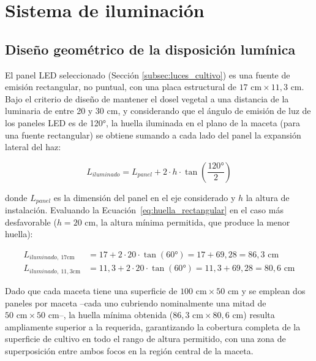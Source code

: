 \section{Sistema de iluminación}

\subsection{Diseño geométrico de la disposición lumínica}
\label{subsec:diseno_geometrico_luz}

El panel LED seleccionado (Sección \ref{subsec:luces_cultivo}) es una fuente de emisión rectangular, no puntual, con una placa estructural de $17\text{ cm} \times 11{,}3\text{ cm}$. Bajo el criterio de diseño de mantener el dosel vegetal a una distancia de la luminaria de entre 20 y 30 cm, y considerando que el ángulo de emisión de luz de los paneles LED es de 120°, la huella iluminada en el plano de la maceta (para una fuente rectangular) se obtiene sumando a cada lado del panel la expansión lateral del haz:

\begin{equation}
    L_{iluminado} = L_{panel} + 2 \cdot h \cdot \tan\left(\frac{120°}{2}\right)
    \label{eq:huella_rectangular}
\end{equation}

\noindent donde $L_{panel}$ es la dimensión del panel en el eje considerado y $h$ la altura de instalación. Evaluando la Ecuación~\ref{eq:huella_rectangular} en el caso más desfavorable ($h = 20\text{ cm}$, la altura mínima permitida, que produce la menor huella):

\begin{align*}
    L_{iluminado,\ 17\text{cm}} &= 17 + 2 \cdot 20 \cdot \tan(60°) = 17 + 69{,}28 = 86{,}3\text{ cm} \\
    L_{iluminado,\ 11{,}3\text{cm}} &= 11{,}3 + 2 \cdot 20 \cdot \tan(60°) = 11{,}3 + 69{,}28 = 80{,}6\text{ cm}
\end{align*}

Dado que cada maceta tiene una superficie de $100\text{ cm} \times 50\text{ cm}$ y se emplean dos paneles por maceta --cada uno cubriendo nominalmente una mitad de $50\text{ cm} \times 50\text{ cm}$--, la huella mínima obtenida ($86{,}3\text{ cm} \times 80{,}6\text{ cm}$) resulta ampliamente superior a la requerida, garantizando la cobertura completa de la superficie de cultivo en todo el rango de altura permitido, con una zona de superposición entre ambos focos en la región central de la maceta.

